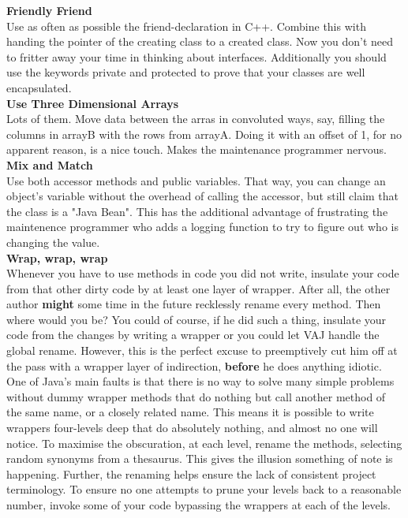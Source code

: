 \documentclass[11pt,twoside,a4paper]{article}
\begin{document}
\textbf{Friendly Friend}~\\
Use as often as possible the friend-declaration in C++. Combine this with handing the pointer of the creating class to a created class. Now you don't need to fritter away your time in thinking about interfaces. Additionally you should use the keywords private and protected to prove that your classes are well encapsulated.~\\ 

\textbf{Use Three Dimensional Arrays}~\\
Lots of them. Move data between the arras in convoluted ways, say, filling the columns in arrayB with the rows from arrayA. Doing it with an offset of 1, for no apparent reason, is a nice touch. Makes the maintenance programmer nervous.~\\ 

\textbf{Mix and Match}~\\
Use both accessor methods and public variables. That way, you can change an object's variable without the overhead of calling the accessor, but still claim that the class is a "Java Bean". This has the additional advantage of frustrating the maintenence programmer who adds a logging function to try to figure out who is changing the value.~\\ 

\textbf{Wrap, wrap, wrap}~\\
Whenever you have to use methods in code you did not write, insulate your code from that other dirty code by at least one layer of wrapper. After all, the other author \textbf{might} some time in the future recklessly rename every method. Then where would you be? You could of course, if he did such a thing, insulate your code from the changes by writing a wrapper or you could let VAJ handle the global rename. However, this is the perfect excuse to preemptively cut him off at the pass with a wrapper layer of indirection, \textbf{before} he does anything idiotic. One of Java's main faults is that there is no way to solve many simple problems without dummy wrapper methods that do nothing but call another method of the same name, or a closely related name. This means it is possible to write wrappers four-levels deep that do absolutely nothing, and almost no one will notice. To maximise the obscuration, at each level, rename the methods, selecting random synonyms from a thesaurus. This gives the illusion something of note is happening. Further, the renaming helps ensure the lack of consistent project terminology. To ensure no one attempts to prune your levels back to a reasonable number, invoke some of your code bypassing the wrappers at each of the levels.~\\ 
\end{document}
